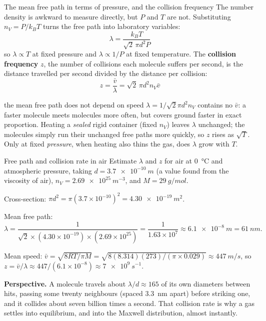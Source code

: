 
\begin{keybox}{The mean free path in terms of pressure, and the collision frequency}
The number density is awkward to measure directly, but $P$ and $T$ are not. Substituting
$n_V = P/k_BT$ turns the free path into laboratory variables:
\[
\boxed{\;\lambda = \frac{k_BT}{\sqrt2\,\pi d^2 P}\;}
\]
so $\lambda \propto T$ at fixed pressure and $\lambda \propto 1/P$ at fixed temperature. The
\textbf{collision frequency} $z$, the number of collisions each molecule suffers per second, is the
distance travelled per second divided by the distance per collision:
\[
\boxed{\;z = \frac{\bar v}{\lambda} = \sqrt2\,\pi d^2 n_V\bar v\;}
\]
\end{keybox}

\begin{trapbox}{the mean free path does not depend on speed}
$\lambda=1/\sqrt2\pi d^2n_V$ contains no $\bar v$: a faster molecule meets molecules more often, but
covers ground faster in exact proportion. Heating a \emph{sealed} rigid container (fixed $n_V$) leaves
$\lambda$ unchanged; the molecules simply run their unchanged free paths more quickly, so $z$ rises as
$\sqrt T$. Only at fixed \emph{pressure}, when heating also thins the gas, does $\lambda$ grow with $T$.
\end{trapbox}

\begin{exbox}{Free path and collision rate in air}\label{ex:ktmfp}
Estimate $\lambda$ and $z$ for air at \SI{0}{\celsius} and atmospheric pressure, taking
$d = \SI{3.7e-10}{m}$ (a value found from the viscosity of air), $n_V = \SI{2.69e25}{m^{-3}}$, and
$M=\SI{29}{g/mol}$.

 Cross-section: $\pi d^2 = \pi(3.7\times10^{-10})^2 = \SI{4.30e-19}{m^2}$.

 Mean free path:
\[
\lambda = \frac{1}{\sqrt2 \times (4.30\times10^{-19}) \times (2.69\times10^{25})}
= \frac{1}{1.63\times10^{7}} \approx \SI{6.1e-8}{m} = \SI{61}{nm}.
\]

 Mean speed: $\bar v=\sqrt{8RT/\pi M}=\sqrt{8(8.314)(273)/(\pi\times0.029)}\approx\SI{447}{m/s}$, so
$z=\bar v/\lambda\approx 447/(6.1\times10^{-8})\approx\SI{7e9}{s^{-1}}$.

 \textbf{Perspective.} A molecule travels about $\lambda/d\approx165$ of its own diameters between
hits, passing some twenty neighbours (spaced \SI{3.3}{nm} apart) before striking one, and it collides
about seven billion times a second. That collision rate is why a gas settles into equilibrium, and into
the Maxwell distribution, almost instantly.
\end{exbox}

